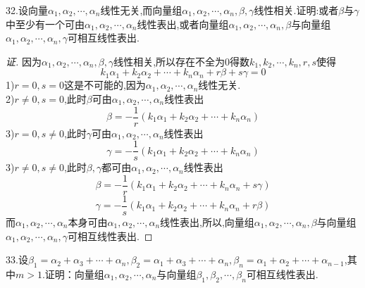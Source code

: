 \documentclass[10pt,a4paper]{report}
\begin{document}
\noindent 32.设向量$\alpha_{1}, \alpha_{2},\cdots ,\alpha_{n}$线性无关,而向量组$\alpha_{1}, \alpha_{2},\cdots ,\alpha_{n},\beta, \gamma$线性相关.证明:或者$\beta$与$\gamma$中至少有一个可由$\alpha_{1}, \alpha_{2},\cdots ,\alpha_{n}$线性表出,或者向量组$\alpha_{1}, \alpha_{2},\cdots ,\alpha_{n},\beta$与向量组$\alpha_{1}, \alpha_{2},\cdots ,\alpha_{n},\gamma$可相互线性表出.
\begin{proof}[证]
	因为$\alpha_{1}, \alpha_{2},\cdots ,\alpha_{n},\beta, \gamma$线性相关,所以存在不全为0得数$k_{1}, k_{2}, \cdots ,k_{n}, r, s$使得
	$$
	k_{1}\alpha_{1}+k_{2}\alpha_{2}+ \cdots +k_{n}\alpha_{n} + r\beta+ s\gamma = 0
	$$
	1)$r=0, s=0$这是不可能的,因为$\alpha_{1}, \alpha_{2},\cdots ,\alpha_{n}$线性无关.\\
	2)$r \neq 0, s=0$,此时$\beta$可由$\alpha_{1}, \alpha_{2},\cdots ,\alpha_{n}$线性表出
	$$
	\beta = -\frac{1}{r}(k_{1}\alpha_{1}+k_{2}\alpha_{2}+ \cdots +k_{n}\alpha_{n})
	$$
	3)$r = 0, s \neq 0$,此时$\gamma$可由$\alpha_{1}, \alpha_{2},\cdots ,\alpha_{n}$线性表出
	$$
	\gamma = -\frac{1}{s}(k_{1}\alpha_{1}+k_{2}\alpha_{2}+ \cdots +k_{n}\alpha_{n})
	$$
	3)$r \neq 0, s \neq 0$,此时$\beta, \gamma$都可由$\alpha_{1}, \alpha_{2},\cdots ,\alpha_{n}$线性表出
	$$
	\beta = -\frac{1}{r}(k_{1}\alpha_{1}+k_{2}\alpha_{2}+ \cdots +k_{n}\alpha_{n}+s\gamma)
	$$
	$$
	\gamma = -\frac{1}{s}(k_{1}\alpha_{1}+k_{2}\alpha_{2}+ \cdots +k_{n}\alpha_{n}+r\beta)
	$$
	而$\alpha_{1}, \alpha_{2},\cdots ,\alpha_{n}$本身可由$\alpha_{1}, \alpha_{2},\cdots ,\alpha_{n}$线性表出,所以,向量组$\alpha_{1}, \alpha_{2},\cdots ,\alpha_{n},\beta$与向量组$\alpha_{1}, \alpha_{2},\cdots ,\alpha_{n},\gamma$可相互线性表出.
\end{proof}
\noindent 33.设$\beta_{1} = \alpha_{2} + \alpha_{3} + \cdots + \alpha_{n}, \beta_{2} = \alpha_{1} + \alpha_{3} + \cdots + \alpha_{n}, \beta_{n} = \alpha_{1} + \alpha_{2} + \cdots + \alpha_{n-1}$,其中$m > 1$.证明：向量组$\alpha_{1}, \alpha_{2}, \cdots, \alpha_{n}$与向量组$\beta_{1}, \beta_{2}, \cdots, \beta_{n}$可相互线性表出.
\end{document}
